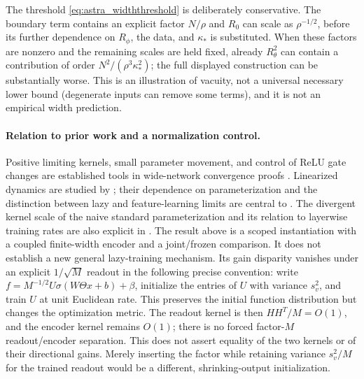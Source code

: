 \begin{remark}
The threshold \eqref{eq:astra_widththreshold} is deliberately
conservative. The boundary term contains an explicit factor $N/\rho$
and $R_0$ can scale as $\rho^{-1/2}$, before its further dependence
on $R_\phi$, the data, and $\kappa_*$ is substituted. When these
factors are nonzero and the remaining scales are held fixed, already
$R_\theta^2$ can contain a contribution of order
$N^2/(\rho^3\kappa_*^2)$; the full displayed construction can be
substantially worse. This is an illustration of vacuity, not a
universal necessary lower bound (degenerate inputs can remove some
terms), and it is not an empirical width prediction.
\end{remark}

\paragraph{Relation to prior work and a normalization control.}
Positive limiting kernels, small parameter movement, and control of
ReLU gate changes are established tools in wide-network convergence
proofs \citep{astra_du2019,astra_arora2019}. Linearized dynamics are
studied by \citet{astra_lee2019}; their dependence on parameterization
and the distinction between lazy and feature-learning limits are
central to \citet{chizat2019lazy,yang2021tensor}.
The divergent kernel scale of the naive standard parameterization and
its relation to layerwise training rates are also explicit in
\citet{astra_sohldickstein2020}.
The result above is a scoped instantiation with a coupled finite-width
encoder and a joint/frozen comparison. It does not establish a new
general lazy-training mechanism. Its gain disparity vanishes under
an explicit $1/\sqrt M$ readout in the following precise convention:
write $f=M^{-1/2}U\sigma(W\Theta x+b)+\beta$, initialize the entries
of $U$ with variance $s_v^2$, and train $U$ at unit Euclidean rate.
This preserves the initial function distribution but changes the
optimization metric. The readout kernel is then $HH^T/M=O(1)$,
and the encoder kernel remains $O(1)$; there is no forced factor-$M$
readout/encoder separation. This does not assert equality of the two
kernels or of their directional gains. Merely inserting the factor
while retaining variance $s_v^2/M$ for the trained readout would be
a different, shrinking-output initialization.

